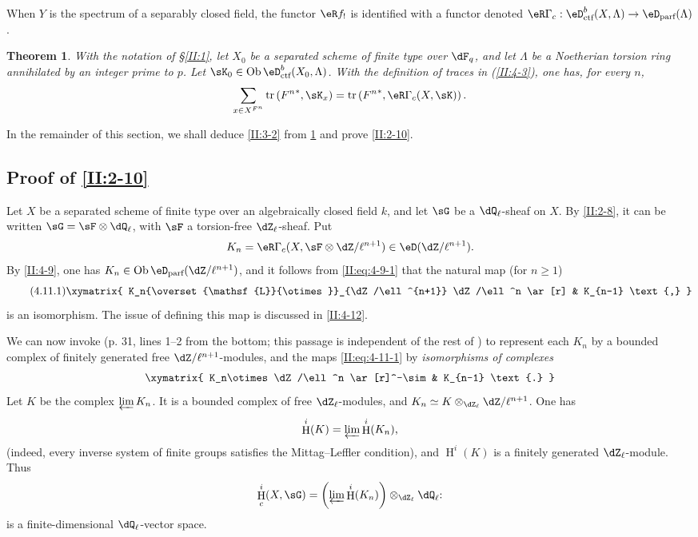 \documentclass[12pt,oneside,english]{smfbook}
\DeclareMathOperator{\h}{H}
\DeclareMathOperator{\ob}{Ob}
\DeclareMathOperator{\tr}{tr}
\newcommand{\lotimes}{{\overset{\mathsf{L}}{\otimes}}}
\newtheorem{theorem_}[subsection]{Theorem}
\begin{document}
When $Y$ is the spectrum of a separably closed field, the functor $\eR f_!$ is identified with a functor denoted $\eR \Gamma_c : \eD_\text{ctf}^b(X,\Lambda)\to\eD_\text{parf}(\Lambda)$.

\begin{theorem_}\label{II:4-10}
With the notation of \S\ref{II:1}, let $X_0$ be a separated scheme of finite type over $\dF_q$, and let $\Lambda$ be a Noetherian torsion ring annihilated by an integer prime to $p$. Let $\sK_0\in\ob\eD_\textnormal{ctf}^b(X_0,\Lambda)$. With the definition of traces in (\ref{II:4-3}), one has, for every $n$,
\begin{equation*}\label{II:eq:4-10}
  \sum_{x\in X^{F^n}} \tr\left({F^n}^*,\sK_x\right) = \tr\left({F^n}^*,\eR\Gamma_c(X,\sK)\right) \text{.}
\end{equation*}
\end{theorem_}

In the remainder of this section, we shall deduce \ref{II:3-2} from \ref{II:4-10} and prove \ref{II:2-10}.

\subsection{Proof of \texorpdfstring{\ref{II:2-10}}{2.10}}\label{II:4-11}

Let $X$ be a separated scheme of finite type over an algebraically closed field $k$, and let $\sG$ be a $\dQ_\ell$-sheaf on $X$. By \ref{II:2-8}, it can be written $\sG=\sF\otimes\dQ_\ell$, with $\sF$ a torsion-free $\dZ_\ell$-sheaf. Put
\[
  K_n = \eR \Gamma_c(X,\sF\otimes\dZ/\ell^{n+1})\in\eD(\dZ/\ell^{n+1}) \text{.}
\]
By \ref{II:4-9}, one has $K_n\in\ob\eD_\text{parf}(\dZ/\ell^{n+1})$, and it follows from \eqref{II:eq:4-9-1} that the natural map (for $n\geqslant1$)
\begin{equation*}\tag{4.11.1}\label{II:eq:4-11-1}
\xymatrix{
  K_n\lotimes_{\dZ/\ell^{n+1}} \dZ/\ell^n \ar[r] & K_{n-1} \text{,}
}
\end{equation*}
is an isomorphism. The issue of defining this map is discussed in \ref{II:4-12}.

We can now invoke \cite[XI.3.3]{sga5} (p. 31, lines 1--2 from the bottom; this passage is independent of the rest of \cite{sga5}) to represent each $K_n$ by a bounded complex of finitely generated free $\dZ/\ell^{n+1}$-modules, and the maps \eqref{II:eq:4-11-1} by \emph{isomorphisms of complexes}
\[\xymatrix{
  K_n\otimes \dZ/\ell^n \ar[r]^-\sim
    & K_{n-1} \text{.}
}\]
Let $K$ be the complex $\varprojlim K_n$. It is a bounded complex of free $\dZ_\ell$-modules, and $K_n\simeq K\otimes_{\dZ_\ell}\dZ/\ell^{n+1}$. One has
\[
  \h^i(K) = \varprojlim \h^i(K_n) \text{,}
\]
(indeed, every inverse system of finite groups satisfies the Mittag--Leffler condition), and $\h^i(K)$ is a finitely generated $\dZ_\ell$-module. Thus
\[
  \h_c^i(X,\sG) = \left(\varprojlim \h^i(K_n) \right)\otimes_{\dZ_\ell} \dQ_\ell \text{:}
\]
is a finite-dimensional $\dQ_\ell$-vector space.
\end{document}
